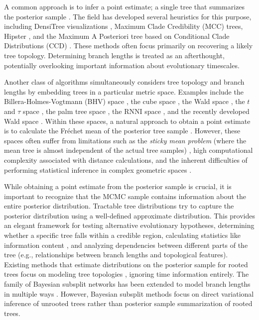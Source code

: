 \documentclass[10pt,letterpaper]{article}
\begin{document}
A common approach is to infer a point estimate; a single  tree that summarizes the posterior sample \cite{treesinforest}. The field has developed several heuristics for this purpose, including DensiTree visualizations \cite{densitree}, Maximum Clade Credibility (MCC) trees, Hipster \cite{hipstr}, and the Maximum A Posteriori tree based on Conditional Clade Distributions (CCD) \cite{ccd,ccdlarget}. These methods often focus primarily on recovering a likely tree topology. Determining branch lengths is treated as an afterthought, potentially overlooking important information about evolutionary timescales.

Another class of algorithms simultaneously considers tree topology and branch lengths by embedding trees in a particular metric space. Examples include the Billera-Holmes-Vogtmann (BHV) space \cite{bhv}, the cube space \cite{cube}, the Wald space \cite{wald}, the $t$ and $\tau$ space \cite{tauspace}, the palm tree space \cite{tropical}, the RNNI space \cite{rnnispace}, and the recently developed Wald space \cite{wald}. Within these spaces, a natural approach to obtain a point estimate is to calculate the Fréchet mean of the posterior tree sample \cite{frechetmeanvar}. However, these spaces often suffer from limitations such as the \emph{sticky mean problem} (where the mean tree is almost independent of the actual tree samples) \cite{sticky}, high computational complexity associated with distance calculations, and the inherent difficulties of performing statistical inference in complex geometric spaces \cite{riemanngaussian}.

While obtaining a point estimate from the posterior sample is crucial, it is important to recognize that the MCMC sample contains information about the entire posterior distribution. Tractable tree distributions \cite{ccd} try to capture the posterior distribution using a well-defined approximate distribution. This provides an elegant framework for testing alternative evolutionary hypotheses, determining whether a specific tree falls within a credible region, calculating statistics like information content \cite{informationcontent}, and analyzing dependencies between different parts of the tree (e.g., relationships between branch lengths and topological features). Existing methods that estimate distributions on the posterior sample for rooted trees focus on modeling tree topologies \cite{ccd,ccdlarget}, ignoring time information entirely. The family of Bayesian subsplit networks \cite{subsplit} has been extended to model branch lengths in multiple ways \cite{subsplitnf,subsplitbranchlengths,artree}. However, Bayesian subsplit methods focus on direct variational inference of unrooted trees rather than posterior sample summarization of rooted trees.
\end{document}
